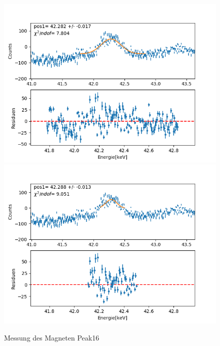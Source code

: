 \documentclass[12pt,a4paper]{article}
\begin{document}
\begin{figure}[H]
\centering
\includegraphics[scale=0.49]{Bilder/roentgen_spektren/magnet/mag16_1.png}
\includegraphics[scale=0.49]{Bilder/roentgen_spektren/magnet/mag16_2.png}
\caption{Messung des Magneten Peak16}
\end{figure}

\newpage
\end{document}
